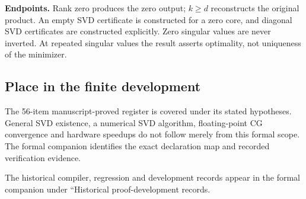 \textbf{Endpoints.} Rank zero produces the zero output; $k\geq d$ reconstructs the original product. An empty SVD certificate is constructed for a zero core, and diagonal SVD certificates are constructed explicitly. Zero singular values are never inverted. At repeated singular values the result asserts optimality, not uniqueness of the minimizer.



\subsection{Place in the finite development}\label{supp6:subsection:006}
The 56-item manuscript-proved register is covered under its stated hypotheses. General SVD existence, a numerical SVD algorithm, floating-point CG convergence and hardware speedups do not follow merely from this formal scope. The formal companion identifies the exact declaration map and recorded verification evidence.

The historical compiler, regression and development records appear in the formal companion under ``Historical proof-development records.
